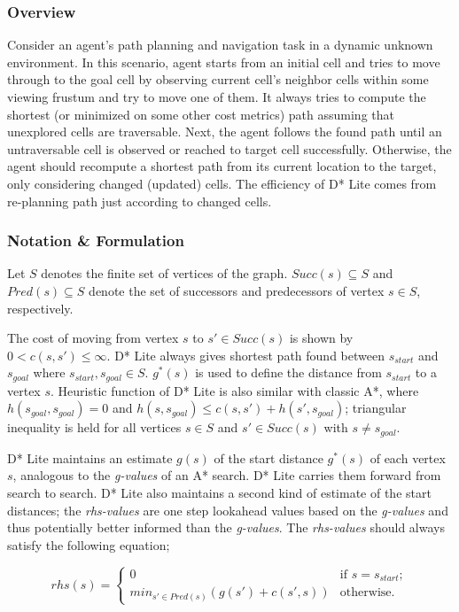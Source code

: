 \documentclass[10pt,journal]{IEEEtran}
\begin{document}
\subsubsection{Overview}

Consider an agent's path planning and navigation task in a dynamic unknown environment. In this scenario, agent starts from an initial cell and tries to move through to the goal cell by observing current cell's neighbor cells within some viewing frustum and try to move one of them. It always tries to compute the shortest (or minimized on some other cost metrics) path assuming that unexplored cells are traversable. Next, the agent follows the found path until an untraversable cell is observed or reached to target cell successfully. Otherwise, the agent should recompute a shortest path from its current location to the target, only considering changed (updated) cells. The efficiency of D* Lite comes from re-planning path just according to changed cells.

\subsubsection{Notation \& Formulation}
Let $S$ denotes the finite set of vertices of the graph. $Succ(s) \subseteq S$ and $Pred(s) \subseteq S$ denote the set of successors and predecessors of vertex $s \in S$, respectively. 

The cost of moving from vertex $s$ to $s' \in Succ(s)$ is shown by $0 < c(s, s') \leq \infty$. D* Lite always gives shortest path found between $s_{start}$ and $s_{goal}$ where $s_{start}, s_{goal} \in S$. $g^*(s)$ is used to define the distance from $s_{start}$ to a vertex $s$. Heuristic function of D* Lite is also similar with classic A*, where $h(s_{goal}, s_{goal}) = 0$ and $h(s, s_{goal}) \leq c(s, s') + h(s', s_{goal})$; triangular inequality is held for all vertices $s \in S$ and $s' \in Succ(s)$ with $s \neq s_{goal}$.

D* Lite maintains an estimate $g(s)$ of the start distance $g^*(s)$ of each vertex $s$, analogous to the \textit{g-values} of an A* search. D* Lite carries them forward from search to search. D* Lite also maintains a second kind of estimate of the start distances; the \textit{rhs-values} are one step lookahead values based on the \textit{g-values} and thus potentially better informed than the \textit{g-values}. The \textit{rhs-values} should always satisfy the following equation;

\[ rhs(s) = \left\{ \begin{array}{cc}
0 & \mbox{if $s=s_{start}$};\\
min_{s' \in Pred(s)}(g(s') + c(s', s)) & \mbox{otherwise}.\end{array} \right. \] 
\end{document}
